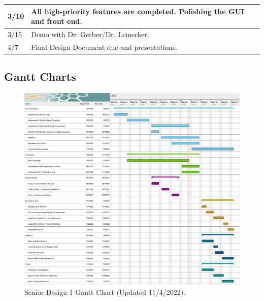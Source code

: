 \documentclass[
    paper=letter,
    parskip=half,
    fontsize=12pt,
    titlepage=firstiscover,
    toc=bibliography,
    numbers=endperiod
]{scrartcl}
\begin{document}
{\begin{tabularx}{\textwidth}{|l|X|}
        3/10          & All high-priority features are completed. Polishing the GUI and front end.                                                                                                                                                                                                                                                                                                                                                           \\\hline
        3/15          & Demo with Dr. Gerber/Dr. Leinecker.                                                                                                                                                                                                                                                                                                                                                                                                  \\\hline
        4/7           & Final Design Document due and presentations.                                                                                                                                                                                                                                                                                                                                                                                         \\\hline
    \end{tabularx}}

\subsection{Gantt Charts}

\begin{figure}[H]
    \includegraphics[width=\textwidth]{gantt-sd1}
    \caption{Senior Design 1 Gantt Chart (Updated 11/4/2022).}
\end{figure}
\end{document}
